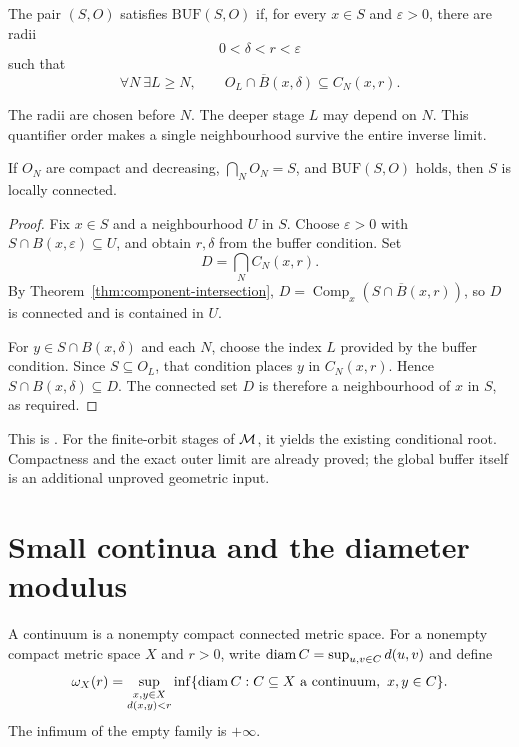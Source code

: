 \begin{definition}
\label{def:uniform-outer-buffer}
The pair $(S,O)$ satisfies $\mathrm{BUF}(S,O)$ if, for every $x\in S$
and $\varepsilon>0$, there are radii
\[
 0<\delta<r<\varepsilon
\]
such that
\[
 \forall N\ \exists L\ge N,\qquad
 O_L\cap\overline B(x,\delta)\subseteq C_N(x,r).
\]
\end{definition}

The radii are chosen before $N$.  The deeper stage $L$ may depend on
$N$.  This quantifier order makes a single neighbourhood survive the
entire inverse limit.

\begin{theorem}
\label{thm:buffer-lc}
If $O_N$ are compact and decreasing, $\bigcap_N O_N=S$, and
$\mathrm{BUF}(S,O)$ holds, then $S$ is locally connected.
\end{theorem}

\begin{proof}
Fix $x\in S$ and a neighbourhood $U$ in $S$.  Choose
$\varepsilon>0$ with $S\cap B(x,\varepsilon)\subseteq U$, and obtain
$r,\delta$ from the buffer condition.  Set
\[
 D=\bigcap_N C_N(x,r).
\]
By Theorem~\ref{thm:component-intersection},
$D=\operatorname{Comp}_x(S\cap\overline B(x,r))$, so $D$ is connected
and is contained in $U$.

For $y\in S\cap B(x,\delta)$ and each $N$, choose the index $L$
provided by the buffer condition.  Since $S\subseteq O_L$, that
condition places $y$ in $C_N(x,r)$.  Hence
$S\cap B(x,\delta)\subseteq D$.  The connected set $D$ is therefore a
neighbourhood of $x$ in $S$, as required.
\end{proof}

This is
.
For the finite-orbit stages of $\mathcal M$, it yields the existing conditional
root.  Compactness and the exact outer limit are already proved; the
global buffer itself is an additional unproved geometric input.

\section{Small continua and the diameter modulus}

\begin{definition}
\label{def:component-modulus}
A continuum is a nonempty compact connected metric space.
For a nonempty compact metric space $X$ and $r>0$, write
$\operatorname{diam} C=\sup_{u,v\in C}d(u,v)$ and define
\[
 \omega_X(r)=
 \sup_{\substack{x,y\in X\\d(x,y)<r}}
 \inf\{\operatorname{diam} C:C\subseteq X\text{ a continuum},\ x,y\in C\}.
\]
The infimum of the empty family is $+\infty$.
\end{definition}

